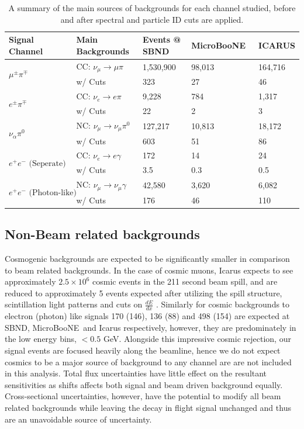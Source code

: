 \documentclass[11pt, a4paper]{article}
\def\muboone{MicroBooNE}
\begin{document}
\begin{table}[t]
\centering
\begin{tabular}{ l | l | l| l | l}
	Signal Channel & Main Backgrounds & Events @ SBND & \muboone\ & ICARUS \\
\hline\hline
\multirow{2}{*}{$\mu^\pm \pi^\mp$} & CC: $\nu_\mu  \rightarrow \mu \pi  $ & 1,530,900  & 98,013 & 164,716\\
													 & w/ Cuts &323 & 27 & 46 \\ \hline
\multirow{2}{*}{$ e^\pm \pi^\mp$} & CC: $\nu_e  \rightarrow e \pi  $ & 9,228  & 784 & 1,317\\
													 & w/ Cuts &22 & 2 & 3 \\ \hline
\multirow{2}{*}{$ \nu_\alpha \pi^0$} & NC: $\nu_\mu  \rightarrow \nu_\mu \pi^0 $ &  127,217 & 10,813 & 18,172\\
													 & w/ Cuts &603 & 51 & 86 \\ \hline
 \multirow{2}{*}{$ e^+e^- \text{ (Seperate)} $} & CC: $\nu_e  \rightarrow e \gamma  $ &  172 & 14 & 24\\
													 & w/ Cuts &3.5 & 0.3 & 0.5\\ \hline
  \multirow{2}{*}{$ e^+ e^- \text{ (Photon-like)}$} & NC: $\nu_\mu  \rightarrow \nu_\mu \gamma $ &  42,580 & 3,620 & 6,082\\
													 & w/ Cuts &176 & 46 & 110 \\ 
 \hline \hline

\end{tabular}
\caption{\label{tab:Rates} A summary of the main sources of backgrounds for each channel studied, before and after spectral and particle ID cuts are applied. }
\end{table}



\subsection{Non-Beam related backgrounds}
Cosmogenic backgrounds are expected to be significantly smaller in comparison to beam related backgrounds. In the case of cosmic muons, Icarus expects to see approximately $2.5 \times 10^{6}$ cosmic events in the 211 second beam spill,
and are reduced to approximately 5 events expected after utilizing the spill
structure, scintillation light patterns and cuts on $\frac{d E}{d x}$
\cite{Antonello:2015lea}. Similarly for cosmic backgrounds to electron (photon)
like signals 170 (146), 136 (88) and 498 (154) are expected at SBND, \muboone\
and Icarus respectively, however, they are predominately in the low energy
bins, $< 0.5$ GeV. Alongside this impressive cosmic rejection, our signal
events are focused heavily along the beamline, hence we do not expect cosmics
to be a major source of background to any channel are are not included in this
analysis. Total flux uncertainties have little effect on the resultant
sensitivities as shifts affects both signal and beam driven background equally.
Cross-sectional uncertainties, however, have the potential to modify all beam
related backgrounds while leaving the decay in flight signal unchanged and thus
are an unavoidable source of uncertainty.
\end{document}
